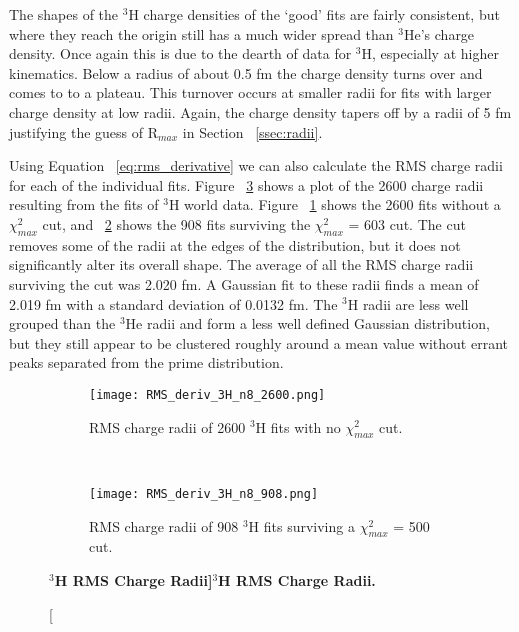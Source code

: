 The shapes of the $^3$H charge densities of the `good' fits are fairly consistent, but where they reach the origin still has a much wider spread than $^3$He's charge density. Once again this is due to the dearth of data for $^3$H, especially at higher kinematics. Below a radius of about 0.5 fm the charge density turns over and comes to to a plateau. This turnover occurs at smaller radii for fits with larger charge density at low radii. Again, the charge density tapers off by a radii of 5 fm justifying the guess of R$_{max}$ in Section ~\ref{ssec:radii}. %

Using Equation ~\ref{eq:rms_derivative} we can also calculate the RMS charge radii for each of the individual fits. Figure ~\ref{fig:3h_rms_deriv} shows a plot of the 2600 charge radii resulting from the fits of $^3$H world data. Figure ~\ref{fig:3h_rms_deriv_no_cut} shows the 2600 fits without a $\chi^2_{max}$ cut, and ~\ref{fig:3h_rms_deriv_cut} shows the 908 fits surviving the $\chi^2_{max}$ = 603 cut. The cut removes some of the radii at the edges of the distribution, but it does not significantly alter its overall shape. The average of all the RMS charge radii surviving the cut was 2.020 fm. A Gaussian fit to these radii finds a mean of 2.019 fm with a standard deviation of 0.0132 fm. The $^3$H radii are less well grouped than the $^3$He radii and form a less well defined Gaussian distribution, but they still appear to be clustered roughly around a mean value without errant peaks separated from the prime distribution.%

\begin{figure}[!ht]
\begin{subfigure}{1.\textwidth}
  \centering
  \texttt{[image: RMS\_deriv\_3H\_n8\_2600.png]}
  \caption{RMS charge radii of 2600 $^3$H fits with no $\chi^2_{max}$ cut.}
  \label{fig:3h_rms_deriv_no_cut}
\end{subfigure}\\
\begin{subfigure}{1.\textwidth}
  \centering
  \texttt{[image: RMS\_deriv\_3H\_n8\_908.png]}
  \caption{RMS charge radii of 908 $^3$H fits surviving a $\chi^2_{max}$ = 500 cut.}
  \label{fig:3h_rms_deriv_cut}
\end{subfigure}
\caption[\bf{$^3$H RMS Charge Radii}]{\bf{$^3$H RMS Charge Radii.}}
\label{fig:3h_rms_deriv}
\end{figure}

